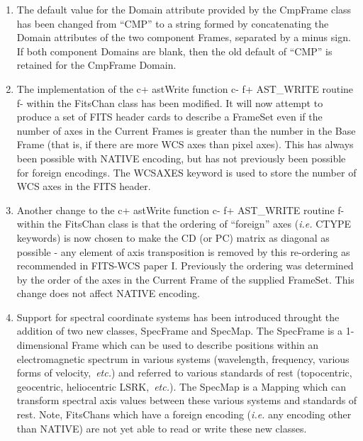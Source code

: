 \documentclass[twoside,11pt]{article}
\begin{document}
\begin{enumerate}

\item The default value for the Domain attribute provided by the CmpFrame 
class has been changed from ``CMP'' to a string formed by concatenating
the Domain attributes of the two component Frames, separated by a minus
sign. If both component Domains are blank, then the old default of
``CMP'' is retained for the CmpFrame Domain.

\item The implementation of the 
c+
astWrite function
c-
f+ 
AST\_WRITE routine
f-
within the FitsChan class has been modified. It will now attempt to
produce a set of FITS header cards to describe a FrameSet even if the
number of axes in the Current Frames is greater than the number in the
Base Frame (that is, if there are more WCS axes than pixel axes). This
has always been possible with NATIVE encoding, but has not previously
been possible for foreign encodings. The WCSAXES keyword is used to store
the number of WCS axes in the FITS header.

\item Another change to the 
c+
astWrite function
c-
f+ 
AST\_WRITE routine
f-
within the FitsChan class is that the ordering of ``foreign'' axes
(\emph{i.e.} CTYPE keywords) is now chosen to make the CD (or PC) matrix
as diagonal as possible - any element of axis transposition is removed by
this re-ordering as recommended in FITS-WCS paper I. Previously the
ordering was determined by the order of the axes in the Current Frame of
the supplied FrameSet. This change does not affect NATIVE encoding.

\item Support for spectral coordinate systems has been introduced
throught the addition of two new classes, SpecFrame and SpecMap.
The SpecFrame is a 1-dimensional Frame which can be used to describe
positions within an electromagnetic spectrum in various systems
(wavelength, frequency, various forms of velocity,~{\em{etc.}}) and referred
to various standards of rest (topocentric, geocentric, heliocentric
LSRK,~{\em{etc.}}). The SpecMap is a Mapping which can transform spectral
axis values between these various systems and standards of rest. Note,
FitsChans which have a foreign encoding (\emph{i.e.} any encoding other
than NATIVE) are not yet able to read or write these new classes.


\end{enumerate}
\end{document}
